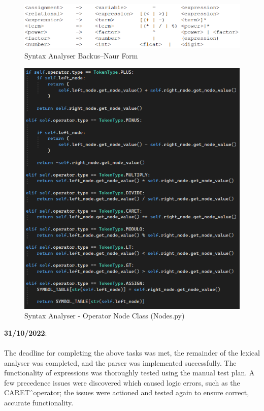 \documentclass[a4paper, oneside, 11pt]{report}
\begin{document}
\begin{figure}[h]
    \centering
    \includegraphics[width=14.5cm]{BNF.png}
    \caption{Syntax Analyser Backus–Naur Form}
    \label{fig:bnf}
\end{figure}

\begin{figure}[h]
    \centering
    \includegraphics[width=12.0cm]{nodeValue.png}
    \caption{Syntax Analyser - Operator Node Class (Nodes.py)}
    \label{fig:bnf}
\end{figure}

\textbf{31/10/2022}:\\ \\
The deadline for completing the above tasks was met, the remainder of the lexical analyser was completed, and the parser was implemented successfully. The functionality of expressions was thoroughly tested using the manual test plan. A few precedence issues were discovered which caused logic errors, such as the CARET\^\ operator; the issues were actioned and tested again to ensure correct, accurate functionality.
\end{document}
